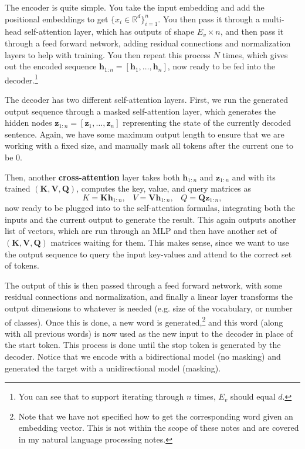       The encoder is quite simple. You take the input embedding and add the positional embeddings to get $\{x_i \in \mathbb{R}^d\}_{i=1}^n$. You then pass it through a multi-head self-attention layer, which has outputs of shape $E_v \times n$, and then pass it through a feed forward network, adding residual connections and normalization layers to help with training. You then repeat this process $N$ times, which gives out the encoded sequence $\mathbf{h}_{1:n} = [\mathbf{h}_1, \ldots, \mathbf{h}_n]$, now ready to be fed into the decoder.\footnote{You can see that to support iterating through $n$ times, $E_v$ should equal $d$.}

      The decoder has two different self-attention layers. First, we run the generated output sequence through a masked self-attention layer, which generates the hidden nodes $\mathbf{z}_{1:n} = [\mathbf{z}_1, \ldots, \mathbf{z}_n]$ representing the state of the currently decoded sentence. Again, we have some maximum output length to ensure that we are working with a fixed size, and manually mask all tokens after the current one to be $0$.

      Then, another \textbf{cross-attention} layer takes both $\mathbf{h}_{1:n}$ and $\mathbf{z}_{1:n}$ and with its trained $(\mathbf{K}, \mathbf{V}, \mathbf{Q})$, computes the key, value, and query matrices as 
      \begin{equation}
        K = \mathbf{K} \mathbf{h}_{1:n}, \;\;\; V = \mathbf{V} \mathbf{h}_{1:n}, \;\;\; Q = \mathbf{Q} \mathbf{z}_{1:n}, 
      \end{equation}
      now ready to be plugged into to the self-attention formulas, integrating both the inputs and the current output to generate the result. This again outputs another list of vectors, which are run through an MLP and then have another set of $(\mathbf{K}, \mathbf{V}, \mathbf{Q})$ matrices waiting for them. This makes sense, since we want to use the output sequence to query the input key-values and attend to the correct set of tokens. 
      
      The output of this is then passed through a feed forward network, with some residual connections and normalization, and finally a linear layer transforms the output dimensions to whatever is needed (e.g. size of the vocabulary, or number of classes). Once this is done, a new word is generated,\footnote{Note that we have not specified how to get the corresponding word given an embedding vector. This is not within the scope of these notes and are covered in my natural language processing notes.} and this word (along with all previous words) is now used as the new input to the decoder in place of the start token. This process is done until the stop token is generated by the decoder. Notice that we encode with a bidirectional model (no masking) and generated the target with a unidirectional model (masking). 

